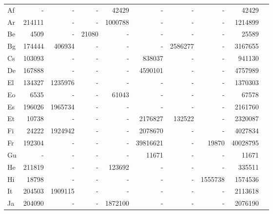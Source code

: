 \documentclass[11pt,a4paper]{article}
\begin{document}
\begin{table*}[htb]
\begin{tabular}{lrrrrrrrrr}
\midrule
Af   & -      & -        & -      & 42429         & -        & -         &        -            & 42429     \\ 
Ar   & 214111 & -        & -      & 1000788       & -        & -         &          -                  & 1214899   \\ 
Be   & 4509   & -        & 21080  & -             & -        & -         &          -                  & 25589     \\ 
Bg   & 174444 & 406934   & -      & -             & -        & 2586277   &          -                  & 3167655   \\ 
Cs   & 103093 & -        & -      & -             & 838037   & -         &            -                & 941130    \\ 
De   & 167888 & -        & -      & -             & 4590101  & -         &           -                 & 4757989   \\ 
El   & 134327 & 1235976  & -      & -             & -        & -         &            -                & 1370303   \\ 
Eo   & 6535   & -        & -      & 61043         & -        & -         &           -                 & 67578     \\ 
Es   & 196026 & 1965734  & -      & -             & -        & -         &          -                  & 2161760   \\ 
Et   & 10738  & -        & -      & -             & 2176827  & 132522    &          -                  & 2320087   \\ 
Fi   & 24222  & 1924942  & -      & -             & 2078670  & -         &          -                  & 4027834   \\ 
Fr   & 192304 & -        & -      & -             & 39816621 & -         & 19870 & 40028795  \\ 
Gu   & -      & -        & -      & -             & 11671    & -         &          -                  & 11671     \\ 
He   & 211819 & -        & -      & 123692        & -        & -         &         -                   & 335511    \\ 
Hi   & 18798  & -        & -      & -             & -        & -         & 1555738                    & 1574536   \\ 
It   & 204503 & 1909115  & -      & -             & -        & -         &       -                     & 2113618   \\ 
Ja   & 204090 & -        & -      & 1872100       & -        & -         &         -                   & 2076190   \\ 

\end{tabular}
\end{table*}
\end{document}
